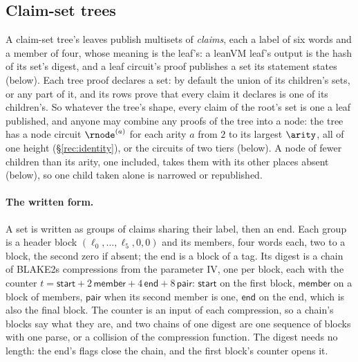 \subsection{Claim-set trees}\label{rec:claimsets}

A claim-set tree's leaves publish multisets of \emph{claims}, each a label of six words and a member of four, whose meaning is the leaf's: a leanVM leaf's output is the hash of its set's digest, and a leaf circuit's proof publishes a set its statement states (below). Each tree proof declares a set: by default the union of its children's sets, or any part of it, and its rows prove that every claim it declares is one of its children's. So whatever the tree's shape, every claim of the root's set is one a leaf published, and anyone may combine any proofs of the tree into a node: the tree has a node circuit $\rnode^{(a)}$ for each arity $a$ from $2$ to its largest $\arity$, all of one height (\S\ref{rec:identity}), or the circuits of two tiers (below). A node of fewer children than its arity, one included, takes them with its other places absent (below), so one child taken alone is narrowed or republished.

\paragraph{The written form.} A set is written as groups of claims sharing their label, then an end. Each group is a header block $(\ell_0,\dots,\ell_5,0,0)$ and its members, four words each, two to a block, the second zero if absent; the end is a block of a tag. Its digest is a chain of BLAKE2s compressions from the parameter IV, one per block, each with the counter $t=\mathsf{start}+2\,\mathsf{member}+4\,\mathsf{end}+8\,\mathsf{pair}$: $\mathsf{start}$ on the first block, $\mathsf{member}$ on a block of members, $\mathsf{pair}$ when its second member is one, $\mathsf{end}$ on the end, which is also the final block. The counter is an input of each compression, so a chain's blocks say what they are, and two chains of one digest are one sequence of blocks with one parse, or a collision of the compression function. The digest needs no length: the end's flags close the chain, and the first block's counter opens it.

